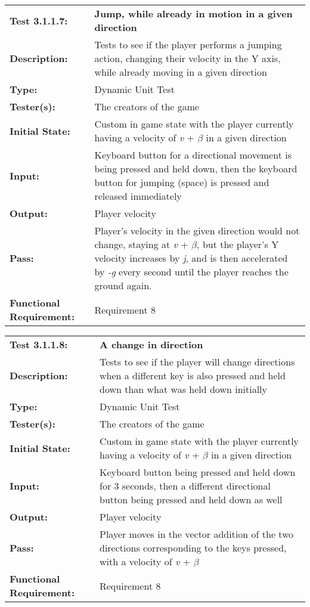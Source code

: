 \documentclass[12pt, titlepage]{article}
\begin{document}
\begin{mdframed}[linewidth=1pt]
\begin{tabularx}{\textwidth}{@{}p{3cm}X@{}}
{\bf Test 3.1.1.7:} & {\bf Jump, while already in motion in a given direction}\\[\baselineskip]
{\bf Description:} & Tests to see if the player performs a jumping action, changing their velocity in the Y axis, while already moving in a given direction\\[0.5\baselineskip]
{\bf Type:} & Dynamic Unit Test\\[0.5\baselineskip]
{\bf Tester(s):} & The creators of the game\\[0.5\baselineskip]
{\bf Initial State:} & Custom in game state with the player currently having a velocity of \textit{v} + $\beta$ in a given direction \\[0.5\baselineskip]
{\bf Input:} & Keyboard button for a directional movement is being pressed and held down, then the keyboard button for jumping (space) is pressed and released immediately\\[0.5\baselineskip]
{\bf Output:} & Player velocity\\[0.5\baselineskip]
{\bf Pass:} & Player's velocity in the given direction would not change, staying at \textit{v} + $\beta$, but the player's Y velocity increases by \textit{j}, and is then accelerated by \textit{-g} every second until the player reaches the ground again. \\[0.5\baselineskip]
{\bf Functional Requirement:} & Requirement 8
\end{tabularx}
\end{mdframed}

\begin{mdframed}[linewidth=1pt]
\begin{tabularx}{\textwidth}{@{}p{3cm}X@{}}
{\bf Test 3.1.1.8:} & {\bf A change in direction}\\[\baselineskip]
{\bf Description:} & Tests to see if the player will change directions when a different key is also pressed and held down than what was held down initially\\[0.5\baselineskip]
{\bf Type:} & Dynamic Unit Test\\[0.5\baselineskip]
{\bf Tester(s):} & The creators of the game\\[0.5\baselineskip]
{\bf Initial State:} & Custom in game state with the player currently having a velocity of \textit{v} + $\beta$ in a given direction\\[0.5\baselineskip]
{\bf Input:} & Keyboard button being pressed and held down for 3 seconds, then a different directional button being pressed and held down as well \\[0.5\baselineskip]
{\bf Output:} & Player velocity\\[0.5\baselineskip]
{\bf Pass:} & Player moves in the vector addition of the two directions corresponding to the keys pressed, with a velocity of \textit{v} + $\beta$ \\[0.5\baselineskip]
{\bf Functional Requirement:} & Requirement 8
\end{tabularx}
\end{mdframed}
\end{document}
